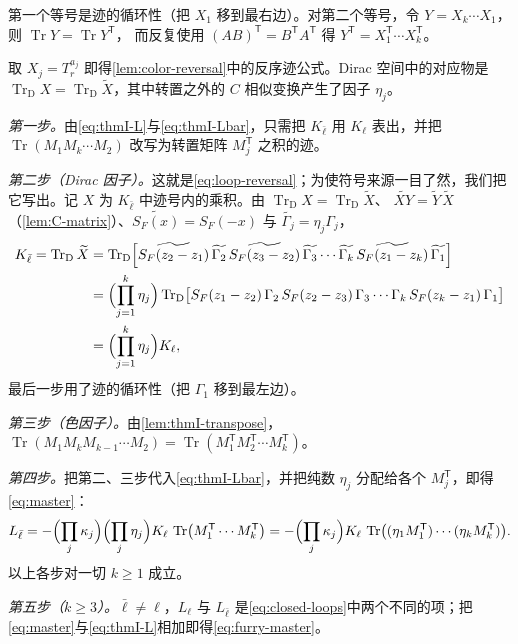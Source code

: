 \documentclass[UTF8,a4paper,11pt,fontset=fandol]{ctexart}
\makeatletter
\theoremstyle{cplain}
\theoremstyle{cdefinition}
\theoremstyle{cremark}
\renewcommand{\proofname}{证明}
\renewenvironment{proof}[1][\proofname]{\par\pushQED{\qed}\normalfont\topsep6\p@\@plus6\p@\relax
  \trivlist\item[\hskip\labelsep\itshape #1\hspace{0.5em}]\ignorespaces}{\popQED\endtrivlist\@endpefalse}
\numberwithin{equation}{section}
\DeclareMathOperator{\Tr}{Tr}
\newcommand{\TrD}{\operatorname{Tr}_{\mathrm{D}}}   %
\newcommand{\tp}{\mathsf{T}}                         %
\newcommand{\SF}{S_{F}}                              %
\newcommand{\Cconj}[1]{\widetilde{#1}}              %
\makeatother
\begin{document}
\begin{proof}
第一个等号是迹的循环性（把 $X_1$ 移到最右边）。对第二个等号，令 $Y=X_k\cdots X_1$，则 $\Tr Y=\Tr Y^{\tp}$，
而反复使用 $(AB)^{\tp}=B^{\tp}A^{\tp}$ 得 $Y^{\tp}=X_1^{\tp}\cdots X_k^{\tp}$。
\end{proof}

取 $X_j=T^{a_j}_r$ 即得\cref{lem:color-reversal}中的反序迹公式。Dirac 空间中的对应物是 $\TrD X=\TrD\Cconj X$，其中转置之外的 $C$ 相似变换产生了因子 $\eta_j$。

\begin{proof}[\cref{thm:furry-single}的证明]
\emph{第一步。}由\cref{eq:thmI-L}与\cref{eq:thmI-Lbar}，只需把 $K_{\bar\ell}$ 用 $K_\ell$ 表出，并把 $\Tr(M_1M_k\cdots M_2)$ 改写为转置矩阵 $M_j^{\tp}$ 之积的迹。

\emph{第二步（Dirac 因子）。}这就是\cref{eq:loop-reversal}；为使符号来源一目了然，我们把它写出。记 $X$ 为 $K_{\bar\ell}$ 中迹号内的乘积。由 $\TrD X=\TrD\Cconj X$、
$\Cconj{XY}=\Cconj Y\,\Cconj X$（\cref{lem:C-matrix}）、$\Cconj{\SF(x)}=\SF(-x)$ 与 $\Cconj{\Gamma_j}=\eta_j\Gamma_j$，
\begin{align}
K_{\bar\ell}=\TrD\Cconj X
&=\TrD\Bigl[\Cconj{\SF(z_2-z_1)}\,\Cconj{\Gamma_2}\,\Cconj{\SF(z_3-z_2)}\,\Cconj{\Gamma_3}\cdots\Cconj{\Gamma_k}\,\Cconj{\SF(z_1-z_k)}\,\Cconj{\Gamma_1}\Bigr]\notag\\
&=\Bigl(\prod_{j=1}^k\eta_j\Bigr)\TrD\bigl[\SF(z_1-z_2)\,\Gamma_2\,\SF(z_2-z_3)\,\Gamma_3\cdots\Gamma_k\,\SF(z_k-z_1)\,\Gamma_1\bigr]\notag\\
&=\Bigl(\prod_{j=1}^k\eta_j\Bigr)K_\ell , \label{eq:thmI-dirac-step}
\end{align}
最后一步用了迹的循环性（把 $\Gamma_1$ 移到最左边）。

\emph{第三步（色因子）。}由\cref{lem:thmI-transpose}，$\Tr(M_1M_kM_{k-1}\cdots M_2)=\Tr(M_1^{\tp}M_2^{\tp}\cdots M_k^{\tp})$。

\emph{第四步。}把第二、三步代入\cref{eq:thmI-Lbar}，并把纯数 $\eta_j$ 分配给各个 $M_j^{\tp}$，即得\cref{eq:master}：
\begin{equation*}
L_{\bar\ell}=-\Bigl(\prod_{j}\kappa_j\Bigr)\Bigl(\prod_{j}\eta_j\Bigr)K_\ell\,\Tr\bigl(M_1^{\tp}\cdots M_k^{\tp}\bigr)
=-\Bigl(\prod_{j}\kappa_j\Bigr)K_\ell\,\Tr\bigl((\eta_1M_1^{\tp})\cdots(\eta_kM_k^{\tp})\bigr).
\end{equation*}
以上各步对一切 $k\ge1$ 成立。

\emph{第五步（$k\ge3$）。}$\bar\ell\neq\ell$，$L_\ell$ 与 $L_{\bar\ell}$ 是\cref{eq:closed-loops}中两个不同的项；把\cref{eq:master}与\cref{eq:thmI-L}相加即得\cref{eq:furry-master}。


\end{proof}
\end{document}
